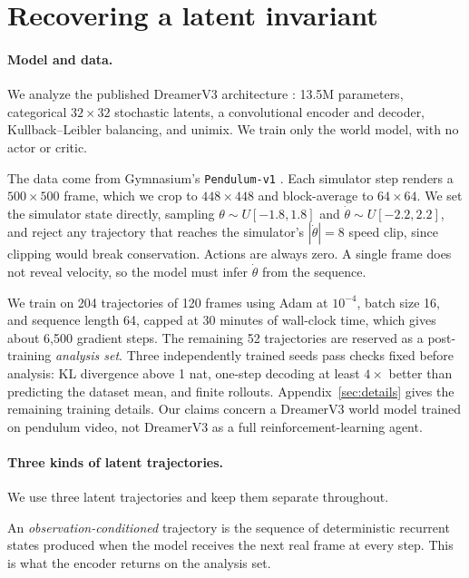 \section{Recovering a latent invariant}
\label{sec:setup}

\paragraph{Model and data.} We analyze the published DreamerV3 architecture
\citep{hafner2023dreamerv3}: 13.5M parameters, categorical $32\times32$ stochastic latents, a
convolutional encoder and decoder, Kullback--Leibler balancing, and unimix. We train only the world
model, with no actor or critic.

The data come from Gymnasium's \texttt{Pendulum-v1} \citep{towers2024gymnasium}. Each simulator step
renders a $500\times500$ frame, which we crop to $448\times448$ and block-average to $64\times64$. We
set the simulator state directly, sampling $\theta\sim U[-1.8,1.8]$ and
$\dot\theta\sim U[-2.2,2.2]$, and reject any trajectory that reaches the simulator's
$|\dot\theta|=8$ speed clip, since clipping would break conservation. Actions are always zero. A
single frame does not reveal velocity, so the model must infer $\dot\theta$ from the sequence.

We train on 204 trajectories of 120 frames using Adam at $10^{-4}$, batch size 16, and sequence
length 64, capped at 30 minutes of wall-clock time, which gives about 6{,}500 gradient steps. The
remaining 52 trajectories are reserved as a post-training \emph{analysis set}. Three independently
trained seeds pass checks fixed before analysis: KL divergence above 1 nat, one-step decoding at
least $4\times$ better than predicting the dataset mean, and finite rollouts.
Appendix~\ref{sec:details} gives the remaining training details. Our claims concern a DreamerV3
world model trained on pendulum video, not DreamerV3 as a full reinforcement-learning agent.

\paragraph{Three kinds of latent trajectories.} We use three latent trajectories and keep them
separate throughout.

An \emph{observation-conditioned} trajectory is the sequence of deterministic recurrent states
produced when the model receives the next real frame at every step. This is what the encoder returns
on the analysis set.

